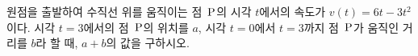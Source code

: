 원점을 출발하여 수직선 위를 움직이는 점~$\mathrm{P}$의 시각 $t$에서의 속도가 $v(t)=6t-3t^2$이다. 시각 $t=3$에서의 점~$\mathrm{P}$의 위치를 $a$, 시각 $t=0$에서 $t=3$까지 점~$\mathrm{P}$가 움직인 거리를 $b$라 할 때, $a+b$의 값을 구하시오.
